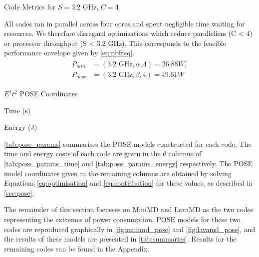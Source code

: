 \begin{table}
  \scriptsize
  \centering
  \caption{Code Metrics for $S = 3.2\text{ GHz}$, $C = 4$}
  \label{tab:code_metrics}
  
\end{table}

All codes ran in parallel across four cores and spent negligible time waiting for resources.
We therefore disregard optimisations which reduce parallelism (C < 4) or processor throughput (S < 3.2 GHz).
This corresponds to the feasible performance envelope given by \autoref{eq:pbfreq}.
\begin{align}
  \label{eq:pbfreq}
  \begin{split}
    P_{min} &= (3.2\text{ GHz}, \alpha, 4) = 26.88W, \\
    P_{max} &= (3.2\text{ GHz}, \beta, 4) = 49.61W
  \end{split}
\end{align}

\begin{table}
  \setlength{\tabcolsep}{.5em}
  \scriptsize
  \caption{$E^1t^2$ POSE Coordinates}
  \begin{subtable}{\linewidth}
  \centering
  \caption{Time (s)}
  
  \label{tab:pose_params_time}
  \end{subtable}
  \par\bigskip 
  \begin{subtable}{\linewidth}
  \centering
  \caption{Energy (J)}
  
  \label{tab:pose_params_energy}
  \end{subtable}
  \label{tab:pose_params}
\end{table}

\noindent
\autoref{tab:pose_params} summarises the POSE models constructed for each code.
The time and energy costs of each code are given in the $\theta$ columns of \autoref{tab:pose_params_time} and \autoref{tab:pose_params_energy} respectively.
The POSE model coordinates given in the remaining columns are obtained by solving Equations \ref{eq:optimisation} and \ref{eq:contribution} for these values, as described in \autoref{sec:pose}.

The remainder of this section focusses on MiniMD and LavaMD as the two codes representing the extremes of power consumption.
POSE models for these two codes are reproduced graphically in \autoref{fig:minimd_pose} and \autoref{fig:lavamd_pose}, and the results of these models are presented in \autoref{tab:summaries}.
Results for the remaining codes can be found in the Appendix.


